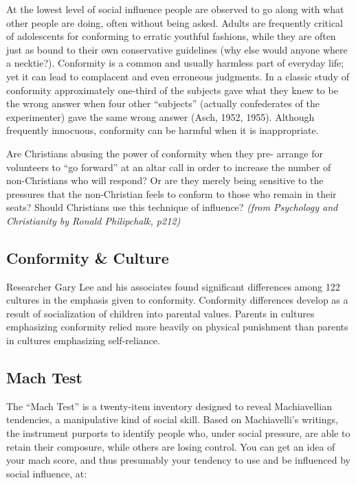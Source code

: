 \documentclass[
]{book}
\begin{document}
At the lowest level of social influence people are observed to go along with what other people are doing, often without being asked. Adults are frequently critical of adolescents for conforming to erratic youthful fashions, while they are often just as bound to their own conservative guidelines (why else would anyone where a necktie?). Conformity is a common and usually harmless part of everyday life; yet it can lead to complacent and even erroneous judgments. In a classic study of conformity approximately one-third of the subjects gave what they knew to be the wrong answer when four other ``subjects'' (actually confederates of the experimenter) gave the same wrong answer (Asch, 1952, 1955). Although frequently innocuous, conformity can be harmful when it is inappropriate.

Are Christians abusing the power of conformity when they pre- arrange for volunteers to ``go forward'' at an altar call in order to increase the number of non-Christians who will respond? Or are they merely being sensitive to the pressures that the non-Christian feels to conform to those who remain in their seats? Should Christians use this technique of influence? \emph{(from Psychology and Christianity by Ronald Philipchalk, p212)}

\hypertarget{conformity-culture}{%
\subsection*{Conformity \& Culture}\label{conformity-culture}}

Researcher Gary Lee and his associates found significant differences among 122 cultures in the emphasis given to conformity. Conformity differences de­velop as a result of socialization of children into parental values. Parents in cul­tures emphasizing conformity relied more heavily on physical punishment than parents in cultures emphasizing self-reliance.

\hypertarget{mach-test}{%
\subsection*{Mach Test}\label{mach-test}}

The ``Mach Test'' is a twenty-item inventory designed to reveal Machiavellian tenden­cies, a manipulative kind of social skill. Based on Machiavelli's writings, the in­stru­ment purports to identify people who, under social pressure, are able to retain their composure, while others are losing control. You can get an idea of your mach score, and thus presumably your tendency to use and be influenced by social influence, at:
\end{document}
